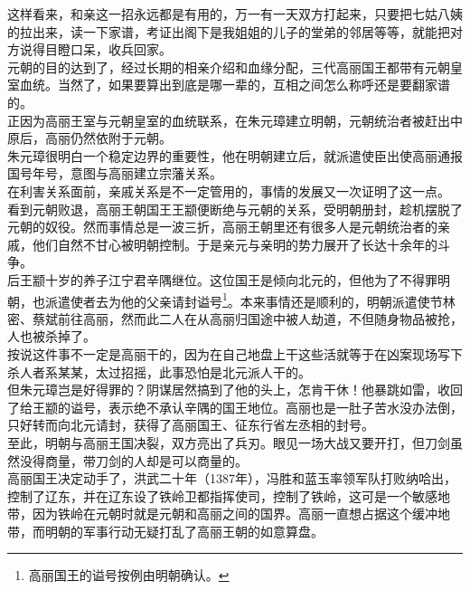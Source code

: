 \begin{multicols}{\theparacolNo}
这样看来，和亲这一招永远都是有用的，万一有一天双方打起来，只要把七姑八姨的拉出来，读一下家谱，考证出阁下是我姐姐的儿子的堂弟的邻居等等，就能把对方说得目瞪口呆，收兵回家。\\

元朝的目的达到了，经过长期的相亲介绍和血缘分配，三代高丽国王都带有元朝皇室血统。当然了，如果要算出到底是哪一辈的，互相之间怎么称呼还是要翻家谱的。\\

正因为高丽王室与元朝皇室的血统联系，在朱元璋建立明朝，元朝统治者被赶出中原后，高丽仍然依附于元朝。\\

朱元璋很明白一个稳定边界的重要性，他在明朝建立后，就派遣使臣出使高丽通报国号年号，意图与高丽建立宗藩关系。\\

在利害关系面前，亲戚关系是不一定管用的，事情的发展又一次证明了这一点。\\

看到元朝败退，高丽王朝国王王颛便断绝与元朝的关系，受明朝册封，趁机摆脱了元朝的奴役。然而事情总是一波三折，高丽王朝里还有很多人是元朝统治者的亲戚，他们自然不甘心被明朝控制。于是亲元与亲明的势力展开了长达十余年的斗争。\\

后王颛十岁的养子江宁君辛隅继位。这位国王是倾向北元的，但他为了不得罪明朝，也派遣使者去为他的父亲请封谥号\footnote{高丽国王的谥号按例由明朝确认。}。本来事情还是顺利的，明朝派遣使节林密、蔡斌前往高丽，然而此二人在从高丽归国途中被人劫道，不但随身物品被抢，人也被杀掉了。\\

按说这件事不一定是高丽干的，因为在自己地盘上干这些活就等于在凶案现场写下杀人者系某某，太过招摇，此事恐怕是北元派人干的。\\

但朱元璋岂是好得罪的？阴谋居然搞到了他的头上，怎肯干休！他暴跳如雷，收回了给王颛的谥号，表示绝不承认辛隅的国王地位。高丽也是一肚子苦水没办法倒，只好转而向北元请封，获得了高丽国王、征东行省左丞相的封号。\\

至此，明朝与高丽王国决裂，双方亮出了兵刃。眼见一场大战又要开打，但刀剑虽然没得商量，带刀剑的人却是可以商量的。\\

高丽国王决定动手了，洪武二十年（1387年），冯胜和蓝玉率领军队打败纳哈出，控制了辽东，并在辽东设了铁岭卫都指挥使司，控制了铁岭，这可是一个敏感地带，因为铁岭在元朝时就是元朝和高丽之间的国界。高丽一直想占据这个缓冲地带，而明朝的军事行动无疑打乱了高丽王朝的如意算盘。\\


\end{multicols}

